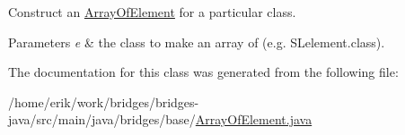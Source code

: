 Construct an \hyperlink{classbridges_1_1base_1_1_array_of_element}{Array\+Of\+Element} for a particular class. 
\begin{DoxyParams}{Parameters}
{\em e} & the class to make an array of (e.\+g. S\+Lelement.\+class). \\
\hline
\end{DoxyParams}


The documentation for this class was generated from the following file\+:\begin{DoxyCompactItemize}
\item 
/home/erik/work/bridges/bridges-\/java/src/main/java/bridges/base/\hyperlink{_array_of_element_8java}{Array\+Of\+Element.\+java}\end{DoxyCompactItemize}
